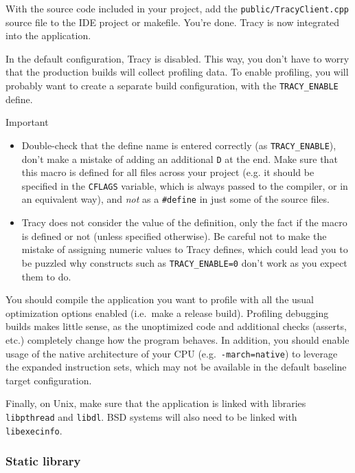 \documentclass[hidelinks,titlepage,a4paper,twoside]{article}
\begin{document}
With the source code included in your project, add the \texttt{public/TracyClient.cpp} source file to the IDE project or makefile. You're done. Tracy is now integrated into the application.

In the default configuration, Tracy is disabled. This way, you don't have to worry that the production builds will collect profiling data. To enable profiling, you will probably want to create a separate build configuration, with the \texttt{TRACY\_ENABLE} define.

\begin{bclogo}[
noborder=true,
couleur=black!5,
logo=\bcbombe
]{Important}
\begin{itemize}
\item Double-check that the define name is entered correctly (as \texttt{TRACY\_ENABLE}), don't make a mistake of adding an additional \texttt{D} at the end. Make sure that this macro is defined for all files across your project (e.g. it should be specified in the \texttt{CFLAGS} variable, which is always passed to the compiler, or in an equivalent way), and \emph{not} as a \texttt{\#define} in just some of the source files.
\item Tracy does not consider the value of the definition, only the fact if the macro is defined or not (unless specified otherwise). Be careful not to make the mistake of assigning numeric values to Tracy defines, which could lead you to be puzzled why constructs such as \texttt{TRACY\_ENABLE=0} don't work as you expect them to do.
\end{itemize}
\end{bclogo}

You should compile the application you want to profile with all the usual optimization options enabled (i.e.~make a release build). Profiling debugging builds makes little sense, as the unoptimized code and additional checks (asserts, etc.) completely change how the program behaves. In addition, you should enable usage of the native architecture of your CPU (e.g.~\texttt{-march=native}) to leverage the expanded instruction sets, which may not be available in the default baseline target configuration.

Finally, on Unix, make sure that the application is linked with libraries \texttt{libpthread} and \texttt{libdl}. BSD systems will also need to be linked with \texttt{libexecinfo}.

\subsubsection{Static library}
\end{document}
